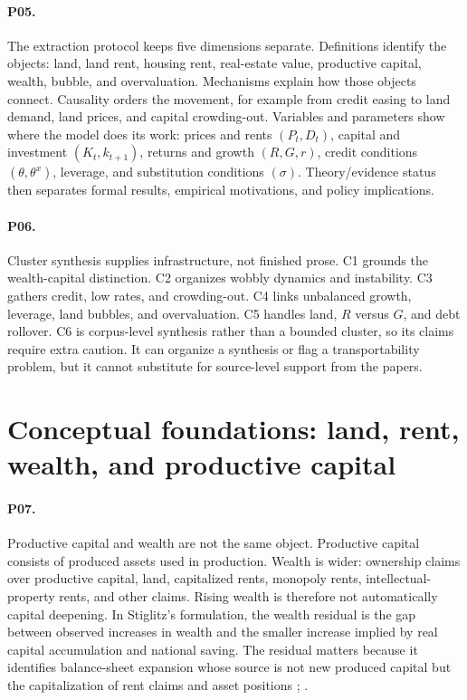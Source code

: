 \documentclass[11pt]{article}
\begin{document}
\paragraph{P05.} The extraction protocol keeps five dimensions separate. Definitions identify the objects: land, land rent, housing rent, real-estate value, productive capital, wealth, bubble, and overvaluation. Mechanisms explain how those objects connect. Causality orders the movement, for example from credit easing to land demand, land prices, and capital crowding-out. Variables and parameters show where the model does its work: prices and rents \((P_t,D_t)\), capital and investment \((K_t,k_{t+1})\), returns and growth \((R,G,r)\), credit conditions \((\theta,\theta^x)\), leverage, and substitution conditions \((\sigma)\). Theory/evidence status then separates formal results, empirical motivations, and policy implications.

\paragraph{P06.} Cluster synthesis supplies infrastructure, not finished prose. C1 grounds the wealth-capital distinction. C2 organizes wobbly dynamics and instability. C3 gathers credit, low rates, and crowding-out. C4 links unbalanced growth, leverage, land bubbles, and overvaluation. C5 handles land, \(R\) versus \(G\), and debt rollover. C6 is corpus-level synthesis rather than a bounded cluster, so its claims require extra caution. It can organize a synthesis or flag a transportability problem, but it cannot substitute for source-level support from the papers.

\section{Conceptual foundations: land, rent, wealth, and productive capital}

\paragraph{P07.} Productive capital and wealth are not the same object. Productive capital consists of produced assets used in production. Wealth is wider: ownership claims over productive capital, land, capitalized rents, monopoly rents, intellectual-property rents, and other claims. Rising wealth is therefore not automatically capital deepening. In Stiglitz's formulation, the wealth residual is the gap between observed increases in wealth and the smaller increase implied by real capital accumulation and national saving. The residual matters because it identifies balance-sheet expansion whose source is not new produced capital but the capitalization of rent claims and asset positions \citep[pp.~10--11, 28]{stiglitz2015WealthResidual}; \citep[pp.~1--2, 4, 11]{stiglitz2015MeasurementWealth}.
\end{document}
